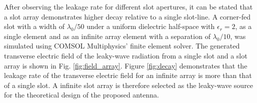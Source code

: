 After observing the leakage rate for different slot apertures, it can be stated that a slot array demonstrates higher decay relative to a single slot-line. A corner-fed slot with a width of $\lambda_0 /50$ under a uniform dielectric half-space with $\epsilon_r = 2$, as a single element and as an infinite array element with a separation of $\lambda_0 /10$, was simulated using COMSOL Multiphysics' finite element solver. The generated transverse electric field of the leaky-wave radiation from a single slot and a slot array is shown in Fig. \ref{fig:field_array}. Figure \ref{fig:decay} demonstrates that the leakage rate of the transverse electric field for an infinite array is more than that of a single slot. A infinite slot array is therefore selected as the leaky-wave source for the theoretical design of the proposed antenna. 


